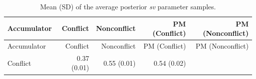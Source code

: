 \documentclass[11pt,]{article}
\begin{document}
\begin{longtable}[]{@{}lrrrr@{}}
\caption{Mean (SD) of the average posterior \emph{sv} parameter
samples.}\tabularnewline
\toprule
\begin{minipage}[b]{0.16\columnwidth}\raggedright\strut
Accumulator\strut
\end{minipage} & \begin{minipage}[b]{0.14\columnwidth}\raggedleft\strut
Conflict\strut
\end{minipage} & \begin{minipage}[b]{0.16\columnwidth}\raggedleft\strut
Nonconflict\strut
\end{minipage} & \begin{minipage}[b]{0.19\columnwidth}\raggedleft\strut
PM (Conflict)\strut
\end{minipage} & \begin{minipage}[b]{0.21\columnwidth}\raggedleft\strut
PM (Nonconflict)\strut
\end{minipage}\tabularnewline
\midrule
\endfirsthead
\toprule
\begin{minipage}[b]{0.16\columnwidth}\raggedright\strut
Accumulator\strut
\end{minipage} & \begin{minipage}[b]{0.14\columnwidth}\raggedleft\strut
Conflict\strut
\end{minipage} & \begin{minipage}[b]{0.16\columnwidth}\raggedleft\strut
Nonconflict\strut
\end{minipage} & \begin{minipage}[b]{0.19\columnwidth}\raggedleft\strut
PM (Conflict)\strut
\end{minipage} & \begin{minipage}[b]{0.21\columnwidth}\raggedleft\strut
PM (Nonconflict)\strut
\end{minipage}\tabularnewline
\midrule
\endhead
\begin{minipage}[t]{0.16\columnwidth}\raggedright\strut
Conflict\strut
\end{minipage} & \begin{minipage}[t]{0.14\columnwidth}\raggedleft\strut
0.37 (0.01)\strut
\end{minipage} & \begin{minipage}[t]{0.16\columnwidth}\raggedleft\strut
0.55 (0.01)\strut
\end{minipage} & \begin{minipage}[t]{0.19\columnwidth}\raggedleft\strut
0.54 (0.02)\strut
\end{minipage} & \begin{minipage}[t]{0.21\columnwidth}\raggedleft\strut

\end{minipage}
\end{longtable}
\end{document}
